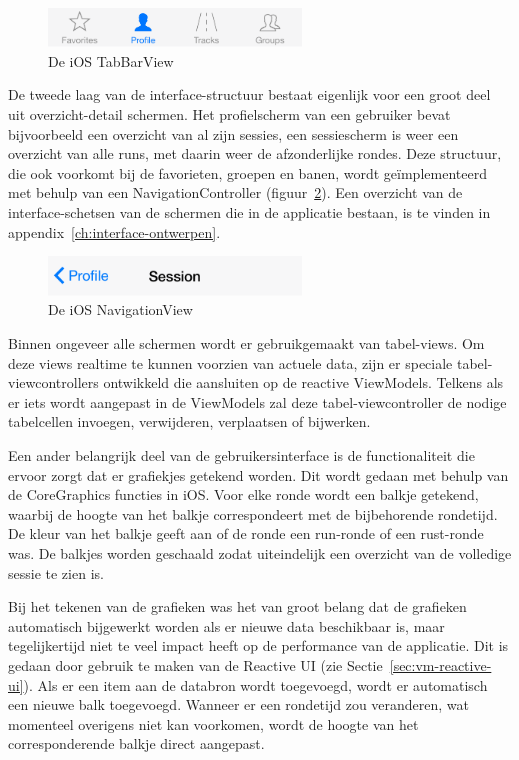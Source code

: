 \begin{figure}[h!t]
\centering
\includegraphics[width=0.6\textwidth]{style/images/TabView}
\caption{De iOS TabBarView}
\label{fig:tab-view}
\end{figure}

De tweede laag van de interface-structuur bestaat eigenlijk voor een groot deel uit overzicht-detail schermen. Het profielscherm van een gebruiker bevat bijvoorbeeld een overzicht van al zijn sessies, een sessiescherm is weer een overzicht van alle runs, met daarin weer de afzonderlijke rondes. Deze structuur, die ook voorkomt bij de favorieten, groepen en banen, wordt geïmplementeerd met behulp van een NavigationController (figuur~\ref{fig:navigation-view}). Een overzicht van de interface-schetsen van de schermen die in de applicatie bestaan, is te vinden in appendix~\ref{ch:interface-ontwerpen}.

\begin{figure}[h!t]
\centering
\includegraphics[width=0.6\textwidth]{style/images/NavigationView}
\caption{De iOS NavigationView}
\label{fig:navigation-view}
\end{figure}

Binnen ongeveer alle schermen wordt er gebruikgemaakt van tabel-views. Om deze views realtime te kunnen voorzien van actuele data, zijn er speciale tabel-viewcontrollers ontwikkeld die aansluiten op de reactive ViewModels. Telkens als er iets wordt aangepast in de ViewModels zal deze tabel-viewcontroller de nodige tabelcellen invoegen, verwijderen, verplaatsen of bijwerken.

Een ander belangrijk deel van de gebruikersinterface is de functionaliteit die ervoor zorgt dat er grafiekjes getekend worden. Dit wordt gedaan met behulp van de CoreGraphics functies in iOS. Voor elke ronde wordt een balkje getekend, waarbij de hoogte van het balkje correspondeert met de bijbehorende rondetijd. De kleur van het balkje geeft aan of de ronde een run-ronde of een rust-ronde was. De balkjes worden geschaald zodat uiteindelijk een overzicht van de volledige sessie te zien is.

Bij het tekenen van de grafieken was het van groot belang dat de grafieken automatisch bijgewerkt worden als er nieuwe data beschikbaar is, maar tegelijkertijd niet te veel impact heeft op de performance van de applicatie. Dit is gedaan door gebruik te maken van de Reactive UI (zie Sectie~\ref{sec:vm-reactive-ui}). Als er een item aan de databron wordt toegevoegd, wordt er automatisch een nieuwe balk toegevoegd. Wanneer er een rondetijd zou veranderen, wat momenteel overigens niet kan voorkomen, wordt de hoogte van het corresponderende balkje direct aangepast.

